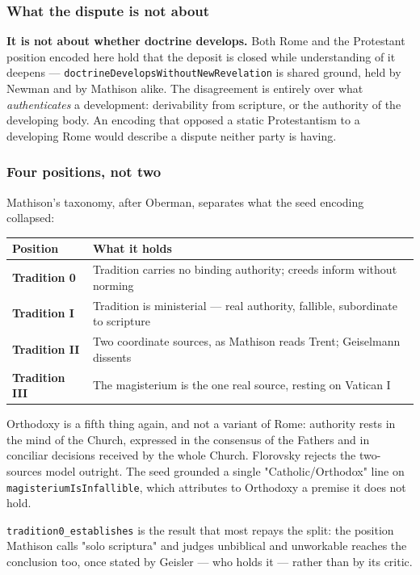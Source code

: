 \documentclass[11pt]{article}
\begin{document}
\subsubsection*{What the dispute is not about}
\textbf{It is not about whether doctrine develops.} Both Rome and the Protestant position encoded here hold that the deposit is closed while understanding of it deepens — \texttt{doctrine\allowbreak{}Develops\allowbreak{}Without\allowbreak{}New\allowbreak{}Revelation} is shared ground, held by Newman and by Mathison alike. The disagreement is entirely over what \emph{authenticates} a development: derivability from scripture, or the authority of the developing body. An encoding that opposed a static Protestantism to a developing Rome would describe a dispute neither party is having.

\subsubsection*{Four positions, not two}
Mathison's taxonomy, after Oberman, separates what the seed encoding collapsed:

\begin{longtable}{@{}>{\raggedright\arraybackslash}p{} >{\raggedright\arraybackslash}p{}@{}}
\toprule
\textbf{Position} & \textbf{What it holds} \\
\midrule
\endhead
\textbf{Tradition 0} & Tradition carries no binding authority; creeds inform without norming \\
\textbf{Tradition I} & Tradition is ministerial — real authority, fallible, subordinate to scripture \\
\textbf{Tradition II} & Two coordinate sources, as Mathison reads Trent; Geiselmann dissents \\
\textbf{Tradition III} & The magisterium is the one real source, resting on Vatican I \\
\bottomrule
\end{longtable}
Orthodoxy is a fifth thing again, and not a variant of Rome: authority rests in the mind of the Church, expressed in the consensus of the Fathers and in conciliar decisions received by the whole Church. Florovsky rejects the two-sources model outright. The seed grounded a single "Catholic/Orthodox" line on \texttt{magisterium\allowbreak{}Is\allowbreak{}Infallible}, which attributes to Orthodoxy a premise it does not hold.

\texttt{tradition0\_\allowbreak{}establishes} is the result that most repays the split: the position Mathison calls "solo scriptura" and judges unbiblical and unworkable reaches the conclusion too, once stated by Geisler — who holds it — rather than by its critic.
\end{document}
